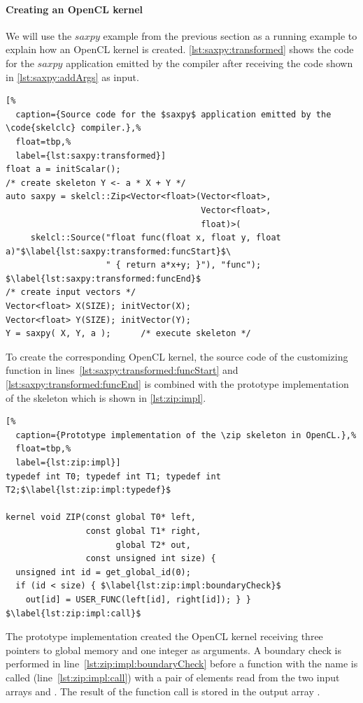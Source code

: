 \paragraph{Creating an OpenCL kernel}
We will use the $saxpy$ example from the previous section as a running example to explain how an OpenCL kernel is created.
\autoref{lst:saxpy:transformed} shows the code for the $saxpy$ application emitted by the  compiler after receiving the code shown in \autoref{lst:saxpy:addArgs} as input.
\begin{lstlisting}[%
  caption={Source code for the $saxpy$ application emitted by the \code{skelclc} compiler.},%
  float=tbp,%
  label={lst:saxpy:transformed}]
float a = initScalar();
/* create skeleton Y <- a * X + Y */
auto saxpy = skelcl::Zip<Vector<float>(Vector<float>,
                                       Vector<float>,
                                       float)>(
     skelcl::Source("float func(float x, float y, float a)"$\label{lst:saxpy:transformed:funcStart}$\
                    " { return a*x+y; }"), "func"); $\label{lst:saxpy:transformed:funcEnd}$
/* create input vectors */
Vector<float> X(SIZE); initVector(X);
Vector<float> Y(SIZE); initVector(Y);
Y = saxpy( X, Y, a );      /* execute skeleton */
\end{lstlisting}

To create the corresponding OpenCL kernel, the source code of the customizing function in lines~\ref{lst:saxpy:transformed:funcStart} and \ref{lst:saxpy:transformed:funcEnd} is combined with the prototype implementation of the \zip skeleton which is shown in \autoref{lst:zip:impl}.
%
\begin{lstlisting}[%
  caption={Prototype implementation of the \zip skeleton in OpenCL.},%
  float=tbp,%
  label={lst:zip:impl}]
typedef int T0; typedef int T1; typedef int T2;$\label{lst:zip:impl:typedef}$

kernel void ZIP(const global T0* left,
                const global T1* right,
                      global T2* out,
                const unsigned int size) {
  unsigned int id = get_global_id(0);
  if (id < size) { $\label{lst:zip:impl:boundaryCheck}$
    out[id] = USER_FUNC(left[id], right[id]); } }  $\label{lst:zip:impl:call}$
\end{lstlisting}
%
The prototype implementation created the OpenCL kernel  receiving three pointers to global memory and one integer as arguments.
A boundary check is performed in line~\ref{lst:zip:impl:boundaryCheck} before a function with the name \code{USER\_FUNC} is called (line~\ref{lst:zip:impl:call}) with a pair of elements read from the two input arrays  and .
The result of the function call is stored in the output array \code{out}.

